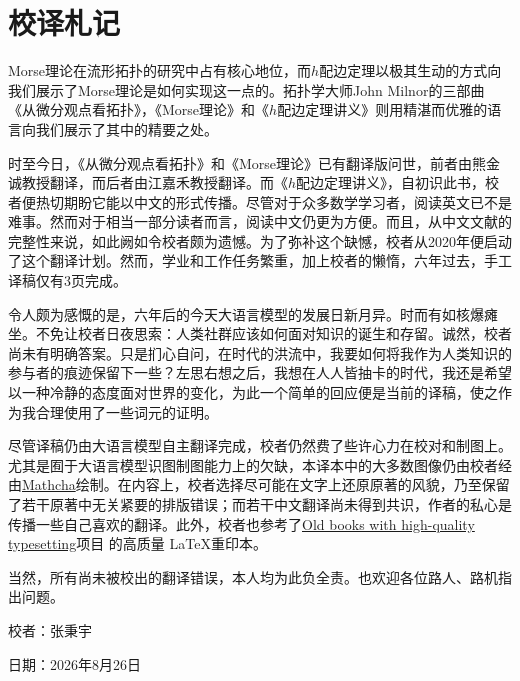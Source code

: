 \cleardoublepage
{}
\chapter*{校译札记}


Morse理论在流形拓扑的研究中占有核心地位，而$h$配边定理以极其生动的方式向我们展示了Morse理论是如何实现这一点的。拓扑学大师John Milnor的三部曲《从微分观点看拓扑》，《Morse理论》和《$h$配边定理讲义》则用精湛而优雅的语言向我们展示了其中的精要之处。

时至今日，《从微分观点看拓扑》和《Morse理论》已有翻译版问世，前者由熊金诚教授翻译，而后者由江嘉禾教授翻译。而《$h$配边定理讲义》，自初识此书，校者便热切期盼它能以中文的形式传播。尽管对于众多数学学习者，阅读英文已不是难事。然而对于相当一部分读者而言，阅读中文仍更为方便。而且，从中文文献的完整性来说，如此阙如令校者颇为遗憾。为了弥补这个缺憾，校者从2020年便启动了这个翻译计划。然而，学业和工作任务繁重，加上校者的懒惰，六年过去，手工译稿仅有3页完成。

令人颇为感慨的是，六年后的今天大语言模型的发展日新月异。时而有如核爆瘫坐。不免让校者日夜思索：人类社群应该如何面对知识的诞生和存留。诚然，校者尚未有明确答案。只是扪心自问，在时代的洪流中，我要如何将我作为人类知识的参与者的痕迹保留下一些？左思右想之后，我想在人人皆抽卡的时代，我还是希望以一种冷静的态度面对世界的变化，为此一个简单的回应便是当前的译稿，使之作为我合理使用了一些词元的证明。

尽管译稿仍由大语言模型自主翻译完成，校者仍然费了些许心力在校对和制图上。尤其是囿于大语言模型识图制图能力上的欠缺，本译本中的大多数图像仍由校者经由\hyperlink{https://www.mathcha.io/}{Mathcha}绘制。在内容上，校者选择尽可能在文字上还原原著的风貌，乃至保留了若干原著中无关紧要的排版错误；而若干中文翻译尚未得到共识，作者的私心是传播一些自己喜欢的翻译。此外，校者也参考了\hyperlink{https://oldbookstonew.blogspot.com/}{Old books with high-quality typesetting}项目
的高质量 \LaTeX 重印本。

当然，所有尚未被校出的翻译错误，本人均为此负全责。也欢迎各位路人、路机指出问题。


\vfill
\begin{flushright}
校者：张秉宇\par
\vspace{1em}
日期：2026年8月26日\par
\end{flushright}
